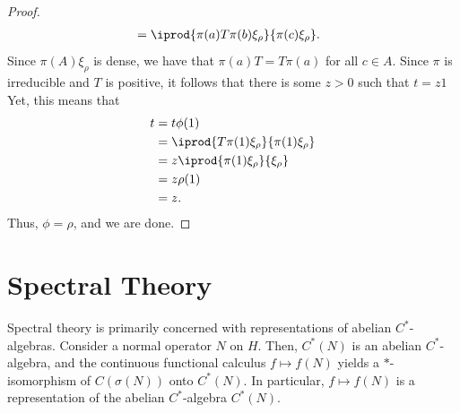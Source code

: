 \documentclass[10pt]{mypackage}
\begin{document}
\begin{proof}
\begin{align*}
                                                      &= \iprod{\pi(a)T\pi(b)\xi_{\rho}}{\pi(c)\xi_{\rho}}.
  \end{align*}
  Since $\pi(A)\xi_{\rho}$ is dense, we have that $\pi(a)T = T\pi(a)$ for all $c\in A$. Since $\pi$ is irreducible and $T$ is positive, it follows that there is some $z > 0$ such that $t = z1$ Yet, this means that
  \begin{align*}
    t &= t\phi(1)\\
      &= \iprod{T\pi(1)\xi_{\rho}}{\pi(1)\xi_{\rho}}\\
      &= z\iprod{\pi(1)\xi_{\rho}}{\xi_{\rho}}\\
      &= z\rho(1)\\
      &= z.
  \end{align*}
  Thus, $\phi = \rho$, and we are done.
\end{proof}
\section{Spectral Theory}%
Spectral theory is primarily concerned with representations of abelian $C^{\ast}$-algebras. Consider a normal operator $N$ on $H$. Then, $C^{\ast}\left( N \right)$ is an abelian $C^{\ast}$-algebra, and the continuous functional calculus $f\mapsto f\left( N \right)$ yields a $\ast$-isomorphism of $C\left( \sigma(N) \right)$ onto $C^{\ast}\left( N \right)$. In particular, $f\mapsto f\left( N \right)$ is a representation of the abelian $C^{\ast}$-algebra $C^{\ast}\left( N \right)$.
\end{document}
